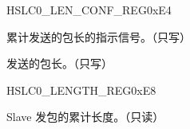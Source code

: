 \documentclass[sdio_slave.tex]{subfiles}
\begin{document}
\begin{register}{H}{SLC0\_LEN\_CONF\_REG}{0xE4}\label{regdesc:SLC0LENCONFREG}
%
%
%
%
%
\regnewline%
\begin{regdesc}\begin{reglist}
\item [SLC0\_LEN\_INC\_MORE]累计发送的包长的指示信号。（只写）
\item [SLC0\_LEN\_WDATA]发送的包长。（只写）
\end{reglist}\end{regdesc}
\end{register}


\begin{register}{H}{SLC0\_LENGTH\_REG}{0xE8}\label{regdesc:SLC0LENGTHREG}
%
%
\regnewline%
\begin{regdesc}\begin{reglist}
\item [SLC0\_LEN] Slave 发包的累计长度。（只读）
\end{reglist}\end{regdesc}
\end{register}
\end{document}

